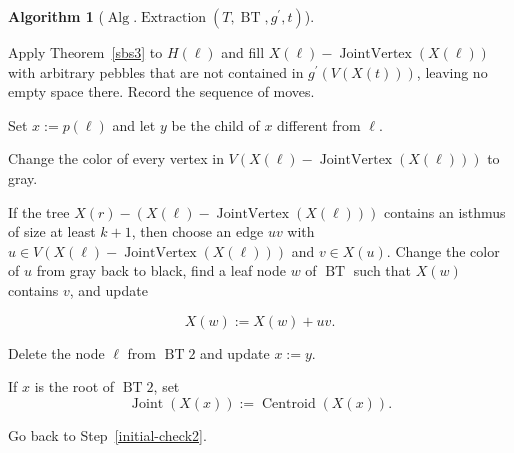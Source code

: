\documentclass[letter,11pt]{article}
\theoremstyle{definition}
\theoremstyle{definition}
\newtheorem{alg}{Algorithm}
\DeclareMathOperator{\BT}{BT}
\DeclareMathOperator{\Alg}{Alg}
\DeclareMathOperator{\Cen}{Centroid}
\DeclareMathOperator{\Joi}{Joint}
\DeclareMathOperator{\JoiV}{JointVertex}
\DeclareMathOperator{\PacCon}{PackedConfig}
\DeclareMathOperator{\Extraction}{Extraction}
\newcommand{\1}{\boldmath$~1~$\unboldmath}
\newcommand{\tume}{\hspace*{0.2em}}
\newcommand{\maru}[1]{{\ooalign{\hfill$\small#1$\hfill\crcr\scalebox{1.3}{$\bigcirc$}}}}
\newenvironment{alg-enumerate}{%
  \begin{enumerate}%
   \renewcommand{\theenumi}{\arabic{enumi}}%
   \renewcommand{\labelenumi}{\rm{{\maru{\theenumi}}\tume\/}}%
   \renewcommand{\labelenumii}{\rm{$(${\maru{\theenumi}}-\theenumii$)$\tume\/}}%
 }{\end{enumerate}%
}
\newcommand{\namelistlabel}[1]{\hspace*{10pt}\mbox{#1}:\hspace{\fill}}
\newenvironment{namelist}[1]{%
    \begin{list}{}
      {\let\makelabel\namelistlabel
      \settowidth{\labelwidth}{#1}
      \setlength{\leftmargin}{1.1\labelwidth}
      \setlength{\labelsep}{5pt}
      \setlength{\parsep}{0pt}}
  }{%
  \end{list}}
\begin{document}
\begin{alg}[$\Alg.\Extraction(T, \BT,g^{\prime},t)$]
\begin{alg-enumerate}
\item Apply Theorem~\ref{sbs3} to $H(\ell)$ and fill
$X(\ell)-\JoiV(X(\ell))$
with arbitrary pebbles that are not contained in
$g^{\prime}(V(X(t)))$,
leaving no empty space there.
Record the sequence of moves.
\label{mini-puzzle-finish}

\item Set $x := p(\ell)$ and let $y$ be the child of $x$ different from $\ell$.

\item Change the color of every vertex in
$V(X(\ell)-\JoiV(X(\ell)))$
to gray.

\item If the tree
$X(r)-(X(\ell)-\JoiV(X(\ell)))$
contains an isthmus of size at least $k+1$,
then choose an edge
$uv$ with
$u \in V(X(\ell)-\JoiV(X(\ell)))$
and $v \in X(u)$.
Change the color of $u$ from gray back to black,
find a leaf node $w$ of $\BT$
such that $X(w)$ contains $v$,
and update

\[
X(w) := X(w) + uv .
\]
\label{hige2}

\item Delete the node $\ell$ from $\BT2$
and update $x := y$.
\label{del-ell}

\item If $x$ is the root of $\BT2$,
set
\[
\Joi(X(x)) := \Cen(X(x)).
\]

\item Go back to Step~\ref{initial-check2}.

\end{alg-enumerate}
\end{alg}
\end{document}
